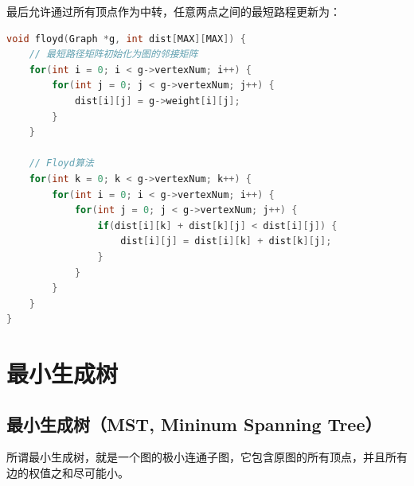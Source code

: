 最后允许通过所有顶点作为中转，任意两点之间的最短路程更新为：

\begin{table}[H]
	\centering
\end{table}


\begin{lstlisting}[language=C]
void floyd(Graph *g, int dist[MAX][MAX]) {
    // 最短路径矩阵初始化为图的邻接矩阵
    for(int i = 0; i < g->vertexNum; i++) {
        for(int j = 0; j < g->vertexNum; j++) {
            dist[i][j] = g->weight[i][j];
        }
    }

    // Floyd算法
    for(int k = 0; k < g->vertexNum; k++) {
        for(int i = 0; i < g->vertexNum; i++) {
            for(int j = 0; j < g->vertexNum; j++) {
                if(dist[i][k] + dist[k][j] < dist[i][j]) {
                    dist[i][j] = dist[i][k] + dist[k][j];
                }
            }
        }
    }
}
\end{lstlisting}

\newpage

\section{最小生成树}

\subsection{最小生成树（MST, Mininum Spanning Tree）}

所谓最小生成树，就是一个图的极小连通子图，它包含原图的所有顶点，并且所有边的权值之和尽可能小。\\

